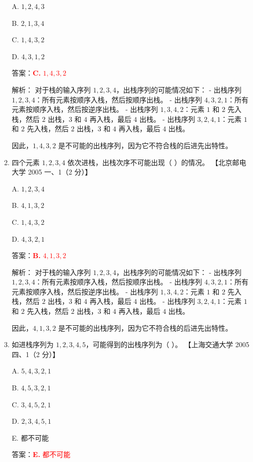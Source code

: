 \documentclass[lang=cn,newtx,10pt,scheme=chinese]{../../../elegantbook}
\begin{document}
\begin{enumerate}
    A. $1, 2, 4, 3$  

    B. $2, 1, 3, 4$  

    C. $1, 4, 3, 2$  

    D. $4, 3, 1, 2$  

    答案：\textcolor{red}{\textbf{C.} $1, 4, 3, 2$}

    解析：
    对于栈的输入序列 $1, 2, 3, 4$，出栈序列的可能情况如下：
    - 出栈序列 $1, 2, 3, 4$：所有元素按顺序入栈，然后按顺序出栈。
    - 出栈序列 $4, 3, 2, 1$：所有元素按顺序入栈，然后按逆序出栈。
    - 出栈序列 $1, 3, 4, 2$：元素 $1$ 和 $2$ 先入栈，然后 $2$ 出栈，$3$ 和 $4$ 再入栈，最后 $4$ 出栈。
    - 出栈序列 $3, 2, 4, 1$：元素 $1$ 和 $2$ 先入栈，然后 $2$ 出栈，$3$ 和 $4$ 再入栈，最后 $4$ 出栈。

    因此，$1, 4, 3, 2$ 是不可能的出栈序列，因为它不符合栈的后进先出特性。

    \item 四个元素 $1, 2, 3, 4$ 依次进栈，出栈次序不可能出现（ ）的情况。  
    【北京邮电大学 2005 一、1（2 分）】  

    A. $1, 2, 3, 4$  

    B. $4, 1, 3, 2$  

    C. $1, 4, 3, 2$  

    D. $4, 3, 2, 1$ 

    答案：\textcolor{red}{\textbf{B.} $4, 1, 3, 2$}

    解析：
    对于栈的输入序列 $1, 2, 3, 4$，出栈序列的可能情况如下：
    - 出栈序列 $1, 2, 3, 4$：所有元素按顺序入栈，然后按顺序出栈。
    - 出栈序列 $4, 3, 2, 1$：所有元素按顺序入栈，然后按逆序出栈。
    - 出栈序列 $1, 3, 4, 2$：元素 $1$ 和 $2$ 先入栈，然后 $2$ 出栈，$3$ 和 $4$ 再入栈，最后 $4$ 出栈。
    - 出栈序列 $3, 2, 4, 1$：元素 $1$ 和 $2$ 先入栈，然后 $2$ 出栈，$3$ 和 $4$ 再入栈，最后 $4$ 出栈。

    因此，$4, 1, 3, 2$ 是不可能的出栈序列，因为它不符合栈的后进先出特性。

    \item 如进栈序列为 $1, 2, 3, 4, 5$，可能得到的出栈序列为（ ）。  
    【上海交通大学 2005 四、1（2 分）】  

    A. $5, 4, 3, 2, 1$  

    B. $4, 5, 3, 2, 1$  

    C. $3, 4, 5, 2, 1$ 

    D. $2, 3, 4, 5, 1$  

    E. 都不可能  

    答案：\textcolor{red}{\textbf{E.} 都不可能}


\end{enumerate}
\end{document}
